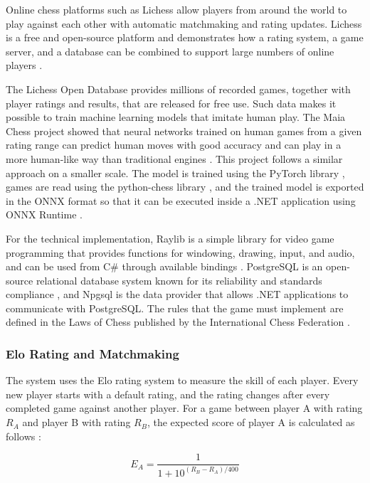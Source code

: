 Online chess platforms such as Lichess allow players from around the world to play against each other with automatic matchmaking and rating updates. Lichess is a free and open-source platform and demonstrates how a rating system, a game server, and a database can be combined to support large numbers of online players \cite{lichess}.

The Lichess Open Database provides millions of recorded games, together with player ratings and results, that are released for free use. Such data makes it possible to train machine learning models that imitate human play. The Maia Chess project showed that neural networks trained on human games from a given rating range can predict human moves with good accuracy and can play in a more human-like way than traditional engines \cite{maia2020}. This project follows a similar approach on a smaller scale. The model is trained using the PyTorch library \cite{pytorch}, games are read using the python-chess library \cite{pythonchess}, and the trained model is exported in the ONNX format so that it can be executed inside a .NET application using ONNX Runtime \cite{onnxruntime}.

For the technical implementation, Raylib is a simple library for video game programming that provides functions for windowing, drawing, input, and audio, and can be used from C\# through available bindings \cite{raylib}. PostgreSQL is an open-source relational database system known for its reliability and standards compliance \cite{postgresql}, and Npgsql is the data provider that allows .NET applications to communicate with PostgreSQL. The rules that the game must implement are defined in the Laws of Chess published by the International Chess Federation \cite{fide}.

\subsubsection{Elo Rating and Matchmaking}
\label{sec:elo}

The system uses the Elo rating system to measure the skill of each player. Every new player starts with a default rating, and the rating changes after every completed game against another player. For a game between player A with rating $R_A$ and player B with rating $R_B$, the expected score of player A is calculated as follows \cite{elo1978rating}:

\begin{equation}
E_A = \frac{1}{1 + 10^{(R_B - R_A)/400}}
\end{equation}

